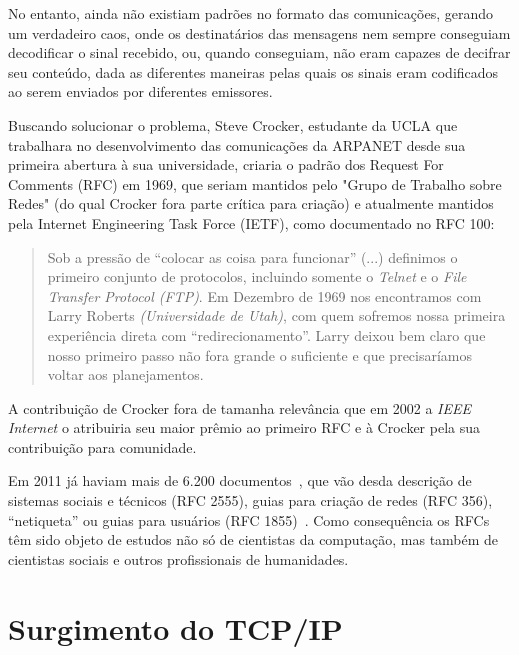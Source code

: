 \documentclass[conference]{IEEEtran}
\begin{document}
  No entanto, ainda não existiam padrões no formato das
  comunicações, gerando um verdadeiro caos, onde os destinatários das mensagens nem sempre conseguiam decodificar o sinal recebido, ou, quando conseguiam, não eram capazes de decifrar seu conteúdo, dada as diferentes maneiras pelas quais os sinais eram codificados ao serem enviados por diferentes emissores.%

  Buscando solucionar o problema, Steve Crocker, estudante da UCLA que trabalhara no desenvolvimento das comunicações da ARPANET desde sua primeira abertura à sua universidade, criaria o padrão dos Request For Comments
  (RFC) em 1969, que seriam mantidos pelo "Grupo de Trabalho sobre Redes" (do qual Crocker fora parte crítica para criação) e atualmente mantidos pela Internet Engineering Task Force (IETF), como documentado no RFC 100:

  \begin{quote}

    Sob a pressão de ``colocar as coisa para funcionar'' (...) definimos o
    primeiro conjunto de protocolos, incluindo somente o \emph{Telnet} e o
    \emph{File Transfer Protocol (FTP)}. Em Dezembro de 1969 nos encontramos com
    Larry Roberts \emph{(Universidade de Utah)}, com quem sofremos nossa
    primeira experiência direta com ``redirecionamento''.
    Larry deixou bem claro que nosso primeiro passo não fora grande o
    suficiente e que precisaríamos voltar aos planejamentos.~\cite{rfc100}
    
  \end{quote}
  
  A contribuição de Crocker fora de tamanha relevância que em 2002 a \emph{IEEE Internet} o atribuiria seu maior prêmio ao primeiro RFC e à Crocker pela sua contribuição para comunidade.

  Em 2011 já haviam mais de 6.200 documentos~\cite{framingyears}, que vão desda
  descrição de sistemas sociais e técnicos (RFC 2555), guias para criação de
  redes (RFC 356), ``netiqueta'' ou guias para usuários
  (RFC 1855)~\cite{framingyears}. Como
  consequência os RFCs têm sido objeto de estudos não só de cientistas da
  computação, mas também de cientistas sociais e outros profissionais de
  humanidades.

  \section{Surgimento do TCP/IP}
	
\end{document}
